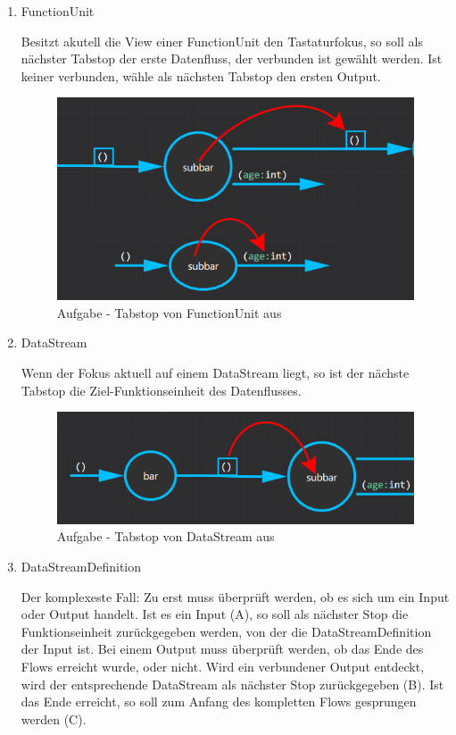\begin{enumerate}
	\item FunctionUnit

	Besitzt akutell die View einer FunctionUnit den Tastaturfokus, so soll als
	nächster Tabstop der erste Datenfluss, der verbunden ist gewählt werden. Ist keiner
	verbunden, wähle als nächsten Tabstop den ersten Output.
	
	\begin{figure}[H]
		\centering
		\includegraphics[width=0.6\linewidth]{./img/tabstop_functionunit.png}
		\caption{Aufgabe - Tabstop von FunctionUnit aus}
	\end{figure}
	
	\item DataStream

	 Wenn der Fokus aktuell auf einem DataStream liegt, so ist der nächste Tabstop die Ziel-Funktionseinheit des Datenflusses.

	\begin{figure}[H]
		\centering
		\includegraphics[width=0.6\linewidth]{./img/tabstop_datastream.png}
		\caption{Aufgabe - Tabstop von DataStream aus}
	\end{figure}
	
	\item DataStreamDefinition

	Der komplexeste Fall: 
	Zu erst muss überprüft werden, ob es sich um ein Input oder Output
	handelt. Ist es ein Input (A), so soll als nächster Stop die Funktionseinheit
	zurückgegeben werden, von der die DataStreamDefinition der Input ist. 
	Bei einem Output muss überprüft werden, ob das Ende des Flows erreicht
	wurde, oder nicht. Wird ein verbundener Output entdeckt, wird der
	entsprechende DataStream als nächster Stop zurückgegeben (B). Ist das Ende
	erreicht, so soll zum Anfang des kompletten Flows gesprungen werden (C).
	

\end{enumerate}
